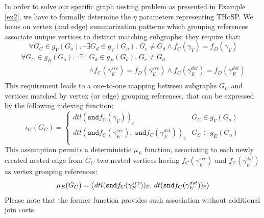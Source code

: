 In order to solve our specific graph nesting problem as presented in Example \vref{ex2}, we have to formally determine the $\eta$ parameters representing THoSP.
We focus on vertex (and edge) summarization patterns which grouping references associate unique vertices to distinct matching subgraphs; they require that:
\[\forall G_C\in g_V(G_o).\neg\exists G_d\in g_V(G_o).\; G_c\neq G_d\wedge f_C(\gamma_V)=f_D(\gamma_V)\]
\[\begin{split}
\forall G_C\in g_E(G_o).\neg\exists &G_d\in g_E(G_o).\; G_c\neq G_d\\
&\wedge f_C(\gamma_E^{src})=f_D(\gamma_E^{src})\wedge f_C(\gamma_E^{dst})=f_D(\gamma_E^{dst})\\
\end{split}\]
This requirement leads to a one-to-one mapping between subgraphs $G_C$ and vertices matched by vertex (or edge) grouping references, that can be expressed by the following indexing function:
\[\iota_G(G_C)=\begin{cases}
dtl(\texttt{snd}f_C(\gamma_V))_{\overline{c}} & G_C \in g_V(G_{o})\\
dtl\left(\texttt{snd}f_C(\gamma_E^{src}),\;\texttt{snd}f_C(\gamma_E^{dst})\right)_{\overline{c}} & G_C \in g_E(G_{o})\\
\end{cases}\]
This assumption permits a deterministic $\mu_E$ function, associating to each newly created nested edge from $G_C$  two nested vertices having $f_C(\gamma_E^{src})$ and $f_C(\gamma_E^{dst})$ as vertex grouping references:
\[\mu_E(G_C)=\Braket{dtl(\texttt{snd}f_C(\gamma_E^{src}))_{\overline{c}},\;dt(\texttt{snd}f_C(\gamma_E^{dst}))_{\overline{c}}}\]
Please note that the former function provides such association without additional join costs. 

